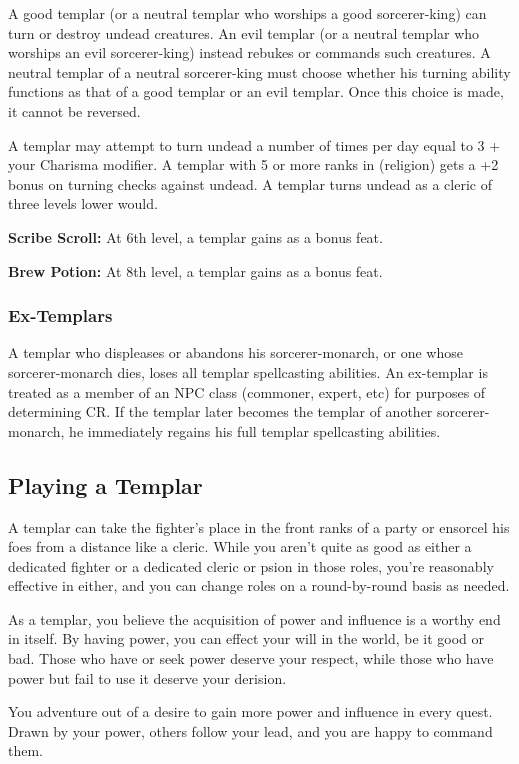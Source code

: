A good templar (or a neutral templar who worships a good sorcerer-king) can turn or destroy undead creatures. An evil templar (or a neutral templar who worships an evil sorcerer-king) instead rebukes or commands such creatures. A neutral templar of a neutral sorcerer-king must choose whether his turning ability functions as that of a good templar or an evil templar. Once this choice is made, it cannot be reversed.

A templar may attempt to turn undead a number of times per day equal to 3 + your Charisma modifier. A templar with 5 or more ranks in  (religion) gets a +2 bonus on turning checks against undead. A templar turns undead as a cleric of three levels lower would.

\textbf{Scribe Scroll:} At 6th level, a templar gains  as a bonus feat.

\textbf{Brew Potion:} At 8th level, a templar gains  as a bonus feat.

\subsubsection{Ex-Templars}
A templar who displeases or abandons his sorcerer-monarch, or one whose sorcerer-monarch dies, loses all templar spellcasting abilities. An ex-templar is treated as a member of an NPC class (commoner, expert, etc) for purposes of determining CR. If the templar later becomes the templar of another sorcerer-monarch, he immediately regains his full templar spellcasting abilities.


\subsection{Playing a Templar}
A templar can take the fighter's place in the front ranks of a party or ensorcel his foes from a distance like a cleric. While you aren't quite as good as either a dedicated fighter or a dedicated cleric or psion in those roles, you're reasonably effective in either, and you can change roles on a round-by-round basis as needed.

As a templar, you believe the acquisition of power and influence is a worthy end in itself. By having power, you can effect your will in the world, be it good or bad. Those who have or seek power deserve your respect, while those who have power but fail to use it deserve your derision.

You adventure out of a desire to gain more power and influence in every quest. Drawn by your power, others follow your lead, and you are happy to command them.

